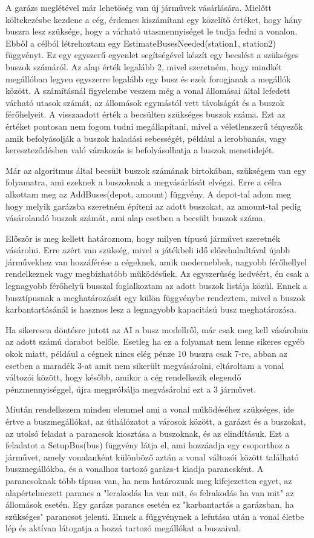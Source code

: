 A garázs meglétével már lehetőség van új járművek vásárlására. Mielőtt költekezésbe kezdene a cég, érdemes kiszámítani egy közelítő értéket, hogy hány buszra lesz szüksége, hogy a várható utasmennyiséget le tudja fedni a vonalon. Ebből a célból létrehoztam egy EstimateBusesNeeded(station1, station2) függvényt. Ez egy egyszerű egyenlet segítségével készít egy becslést a szükséges buszok számáról. Az alap érték legalább 2, mivel szeretném, hogy mindkét megállóban legyen egyszerre legalább egy busz és ezek forogjanak a megállók között. A számításnál figyelembe veszem még a vonal állomásai által lefedett várható utasok számát, az állomások egymástól vett távolságát és a buszok férőhelyeit. A visszaadott érték a becsülten szükséges buszok száma. Ezt az értéket pontosan nem fogom tudni megállapítani, mivel a véletlenszerű tényezők amik befolyásolják a buszok haladási sebességét, például a lerobbanás, vagy kereszteződésben való várakozás is befolyásolhatja a buszok menetidejét.

Már az algoritmus által becsült buszok számának birtokában, szükségem van egy folyamatra, ami ezeknek a buszoknak a megvásárlását elvégzi. Erre a célra alkottam meg az AddBuses(depot, amount) függvény. A depot-tal adom meg hogy melyik garázsba szeretném építeni az adott buszokat, az amount-tal pedig vásárolandó buszok számát, ami alap esetben a becsült buszok száma.

Először is meg kellett határoznom, hogy milyen típusú járművet szeretnék vásárolni. Erre azért van szükség, mivel a játékbeli idő előrehaladtával újabb járművekhez van hozzáférése a cégeknek, amik modernebbek, nagyobb férőhellyel rendelkeznek vagy megbízhatóbb működésűek. Az egyszerűség kedvéért, én csak a legnagyobb férőhelyű busszal foglalkoztam az adott buszok listája közül. Ennek a busztípusnak a meghatározását egy külön függvénybe rendeztem, mivel a buszok karbantartásánál is hasznos lesz a legnagyobb kapacitású busz meghatározása.

Ha sikeresen döntésre jutott az AI a busz modellről, már csak meg kell vásárolnia az adott számú darabot belőle. Esetleg ha ez a folyamat nem lenne sikeres egyéb okok miatt, például a cégnek nincs elég pénze 10 buszra csak 7-re, abban az esetben a maradék 3-at amit nem sikerült megvásárolni, eltároltam a vonal változói között, hogy később, amikor a cég rendelkezik elegendő pénzmennyiséggel, újra megpróbálja megvásárolni ezt a 3 járművet.

Miután rendelkezem minden elemmel ami a vonal működéséhez szükséges, ide értve a buszmegállókat, az úthálózatot a városok között, a garázst és a buszokat, az utolsó feladat a parancsok kiosztása a buszoknak, és az elindításuk. Ezt a feladatot a SetupBus(bus) függvény látja el, ami hozzáadja egy csoporthoz a járművet, amely vonalanként különböző aztán a vonal változói között található buszmegállókba, és a vonalhoz tartozó garázs-t kiadja parancsként. A parancsoknak több típusa van, ha nem határozunk meg kifejezetten egyet, az alapértelmezett parancs a "lerakodás ha van mit, és felrakodás ha van mit" az állomások esetén. Egy garázs parancs esetén ez "karbantartás a garázsban, ha szükséges" parancsot jelenti. Ennek a függvénynek a lefutása után a vonal életbe lép és aktívan látogatja a hozzá tartozó megállókat a buszaival.

